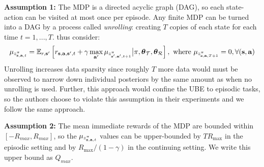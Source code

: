 \documentclass{article}
\begin{document}
\begin{appendices}
\textbf{Assumption 1:} The MDP is a directed acyclic graph (DAG), so each state-action can be visited at most once per episode. Any finite MDP can be turned into a DAG by a process called \textit{unrolling}: creating $T$ copies of each state for each time $t = 1, ..., T$. \cite{ube} thus consider:
\begin{align} \label{app:eq:bet}
\mu_{z^\pi_{\mathbf{s}, \mathbf{a}, t}} = \operatorname{\mathbb{E}}_{r, \mathbf{s}'}\left[ r_{\mathbf{s}, \mathbf{a}, \mathbf{s}', t} + \gamma \max_{\mathbf{a}'}  \mu_{z^\pi_{\mathbf{s}', \mathbf{a}', t + 1}} \big| \pi, \boldsymbol{\theta}_{\mathcal{T}}, \boldsymbol{\theta}_{\mathcal{R}} \right], \text{ where } \mu_{z^\pi_{\mathbf{s}, \mathbf{a}, T + 1}} = 0, \forall (\mathbf{s}, \mathbf{a})
\end{align}
Unrolling increases data sparsity since roughly $T$ more data would must be observed to narrow down individual posteriors by the same amount as when no unrolling is used. Further, this approach would confine the UBE to episodic tasks, so the authors choose to violate this assumption in their experiments and we follow the same approach.

\textbf{Assumption 2:} The mean immediate rewards of the MDP are bounded within $[-R_{max}, R_{max}]$, so the $\mu_{z^\pi_{\mathbf{s}, \mathbf{a}, t}}$ values can be upper-bounded by $T R_{\max}$ in the episodic setting and by $R_{\max} / (1 - \gamma)$ in the continuing setting. We write this upper bound as $Q_{max}$.



\end{appendices}
\end{document}
